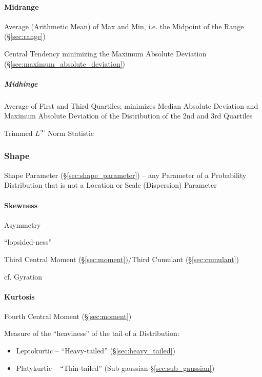 \paragraph{Midrange}\label{sec:midrange}\hfill

Average (Arithmetic Mean) of Max and Min, i.e. the Midpoint of the Range
(\S\ref{sec:range})

Central Tendency minimizing the Maximum Absolute Deviation
(\S\ref{sec:maximum_absolute_deviation})



\subparagraph{Midhinge}\label{sec:midhinge}\hfill

Average of First and Third Quartiles; minimizes Median Absolute Deviation and
Maximum Absolute Deviation of the Distribution of the 2nd and 3rd Quartiles

Trimmed $L^\infty$ Norm Statistic



\subsubsection{Shape}\label{sec:distribution_shape}

\fist Shape Parameter (\S\ref{sec:shape_parameter}) -- any Parameter of a
Probability Distribution that is not a Location or Scale (Dispersion) Parameter



\paragraph{Skewness}\label{sec:skewness}\hfill

Asymmetry %

``lopsided-ness''

Third Central Moment (\S\ref{sec:moment})/Third Cumulant (\S\ref{sec:cumulant})

cf. Gyration



\paragraph{Kurtosis}\label{sec:kurtosis}\hfill

Fourth Central Moment (\S\ref{sec:moment})

Measure of the ``heaviness'' of the tail of a Distribution:

\begin{itemize}
  \item Leptokurtic -- ``Heavy-tailed'' (\S\ref{sec:heavy_tailed})
  \item Platykurtic -- ``Thin-tailed'' (Sub-gaussian \S\ref{sec:sub_gaussian})
\end{itemize}



